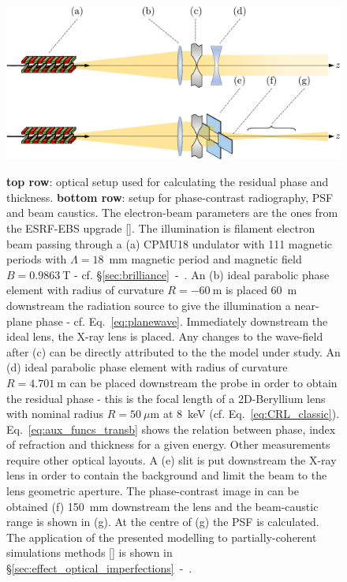 \begin{refsection}
\begin{figure}[hp]
    \centering
    {\includegraphics[width=.7\linewidth]{figures/ch04/simulations.pdf}}
    \caption[Optical layout used for modelling imperfections in CRL]{\textbf{top row}: optical setup used for calculating the residual phase and thickness. \textbf{bottom row}: setup for phase-contrast radiography, PSF and beam caustics. The electron-beam parameters are the ones from the ESRF-EBS upgrade [\cite{orangebook}]. The illumination is filament electron beam passing through a (a) CPMU18 undulator with 111 magnetic periods with $\Lambda=18$~mm magnetic period and magnetic field $B=0.9863~$T - cf. \S\ref{sec:brilliance}~-~\textit{}. An (b) ideal parabolic phase element with radius of curvature $R=-60~$m is placed 60~m downstream the radiation source to give the illumination a near-plane phase - cf. Eq.~\ref{eq:planewave}. Immediately downstream the ideal lens, the X-ray lens is placed. Any changes to the wave-field after (c) can be directly attributed to the the model under study. An (d) ideal parabolic phase element with radius of curvature $R=4.701~$m can be placed downstream the probe in order to obtain the residual phase - this is the focal length of a 2D-Beryllium lens with nominal radius $R=50~\mu\text{m}$ at 8~keV (cf. Eq.~\ref{eq:CRL_classic}). Eq.~\ref{eq:aux_funcs_transb} shows the relation between phase, index of refraction and thickness for a given energy. Other measurements require other optical layouts. A (e) slit is put downstream the X-ray lens in order to contain the background and limit the beam to the lens geometric aperture. The phase-contrast image in can be obtained (f) 150~mm downstream the lens and the beam-caustic range is shown in (g). At the centre of (g) the PSF is calculated. The application of the presented modelling to partially-coherent simulations methods [\cite{Chubar2011}] is shown in \S\ref{sec:effect_optical_imperfections}~-~\textit{}.}
    \label{fig:optical_layouts}
\end{figure}

\end{refsection}
